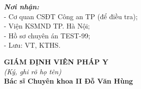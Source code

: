 \documentclass[12pt,a4paper]{article}
\begin{document}
\vspace{0.8cm}

\noindent
\begin{minipage}[t]{0.45\textwidth}
    \small
    \textbf{\textit{Nơi nhận:}}\\
    - Cơ quan CSĐT Công an TP (để điều tra);\\
    - Viện KSMND TP. Hà Nội;\\
    - Hồ sơ chuyên án TEST-99;\\
    - Lưu: VT, KTHS.
\end{minipage}
\hfill
\begin{minipage}[t]{0.5\textwidth}
    \begin{center}
        \small
        \textbf{GIÁM ĐỊNH VIÊN PHÁP Y}\\
        \textit{(Ký, ghi rõ họ tên)}\\[1.5cm]
        \textbf{Bác sĩ Chuyên khoa II Đỗ Văn Hùng}
    \end{center}
\end{minipage}
\end{document}
